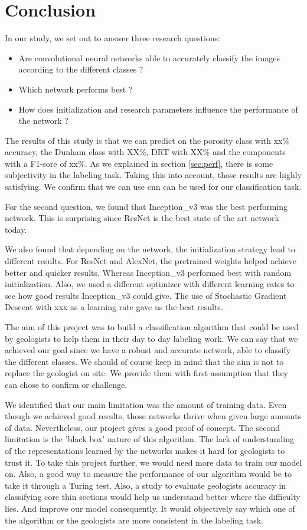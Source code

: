 \chapter{Conclusion}\label{chp:conclusion}
In our study, we set out to answer three research questions: 
\begin{itemize}
    \item Are convolutional neural networks able to accurately classify the images according to the different classes ?
    \item Which network performs best ?
    \item How does initialization and research parameters influence the performance of the network ?
\end{itemize}


The results of this study is that we can predict on the porosity class with xx\% accuracy, the Dunham class with XX\%, DRT with XX\% and the components with a F1-sore of xx\%. As we explained in section \ref{sec:perf}, there is some subjectivity in the labeling task. Taking this into account, those results are highly satisfying. We confirm that we can use \gls{cnn} can be used for our classification task.

For the second question, we found that Inception\_v3 was the best performing network. This is surprising since ResNet is the best state of the art network today. 

We also found  that depending on the network, the initialization strategy  lead to different results. For ResNet and AlexNet, the pretrained weights helped achieve better and quicker results. Whereas Inception\_v3 performed best with random initialization. Also, we used a different optimizer with different learning rates to see how good results Inception\_v3 could give. The use of Stochastic Gradient Descent with xxx as a learning rate gave us the best results.

The aim of this project was to build a classification algorithm that could be used by geologists to help them in their day to day labeling work. We can say that we achieved our goal since we have a robust and accurate network, able to classify the different classes. We should of course keep in mind that the aim is not to replace the geologist on site. We provide them with first assumption that they can chose to confirm or challenge. 

We identified that our main limitation was the amount of training data. Even though we achieved good results, those networks thrive when given large amounts of data. Nevertheless, our project gives a good proof of concept. The second limitation is the 'black box' nature of this algorithm. The lack of understanding of the representations learned by the networks makes it hard for geologists to trust it.
To take this project further, we would need more data to train our model on. Also, a good way to measure the performance of our algorithm would be to take it through a Turing test. Also, a study to evaluate geologists accuracy in classifying core thin sections would help us understand better where the difficulty lies. And improve  our model consequently. It would objectively say which one of the algorithm or the geologists are more consistent in the labeling task. 

